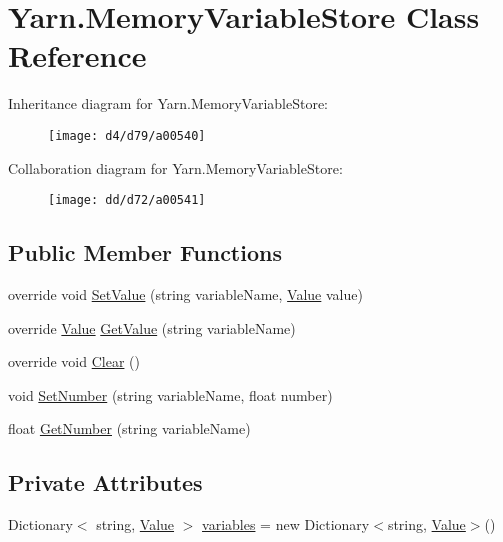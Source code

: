 \hypertarget{a00110}{\section{Yarn.\-Memory\-Variable\-Store Class Reference}
\label{a00110}
}


Inheritance diagram for Yarn.\-Memory\-Variable\-Store\-:
\nopagebreak
\begin{figure}[H]
\begin{center}
\leavevmode
\texttt{[image: d4/d79/a00540]}
\end{center}
\end{figure}


Collaboration diagram for Yarn.\-Memory\-Variable\-Store\-:
\nopagebreak
\begin{figure}[H]
\begin{center}
\leavevmode
\texttt{[image: dd/d72/a00541]}
\end{center}
\end{figure}
\subsection*{Public Member Functions}
\begin{DoxyCompactItemize}
\item 
override void \hyperlink{a00110_a653a459811e5c19549f4b31269093ef5}{Set\-Value} (string variable\-Name, \hyperlink{a00163}{Value} value)
\item 
override \hyperlink{a00163}{Value} \hyperlink{a00110_a0ce77e8245c504a777540e359704aa2a}{Get\-Value} (string variable\-Name)
\item 
override void \hyperlink{a00110_aa6d243e7ef02b91f793a221f509dae69}{Clear} ()
\item 
void \hyperlink{a00023_a48b93de9cd7ae61d0cd9583c8330d3ee}{Set\-Number} (string variable\-Name, float number)
\item 
float \hyperlink{a00023_a1b7f7f4468b2463e7b47986d99362279}{Get\-Number} (string variable\-Name)
\end{DoxyCompactItemize}
\subsection*{Private Attributes}
\begin{DoxyCompactItemize}
\item 
Dictionary$<$ string, \hyperlink{a00163}{Value} $>$ \hyperlink{a00110_aad18acd95297edb8ed496857337f8071}{variables} = new Dictionary$<$string, \hyperlink{a00163}{Value}$>$()
\end{DoxyCompactItemize}


